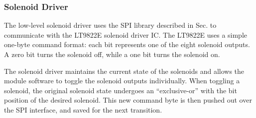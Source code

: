

\subsubsection{Solenoid Driver}

The low-level solenoid driver uses the SPI library described in Sec. \label{sec:impl_spi_driver} to communicate with the LT9822E solenoid driver IC. The LT9822E uses a simple one-byte command format: each bit represents one of the eight solenoid outputs. A zero bit turns the solenoid off, while a one bit turns the solenoid on. 

The solenoid driver maintains the current state of the solenoids and allows the module software to toggle the solenoid outputs individually. When toggling a solenoid, the original solenoid state undergoes an ``exclusive-or'' with the bit position of the desired solenoid. This new command byte is then pushed out over the SPI interface, and saved for the next transition.
